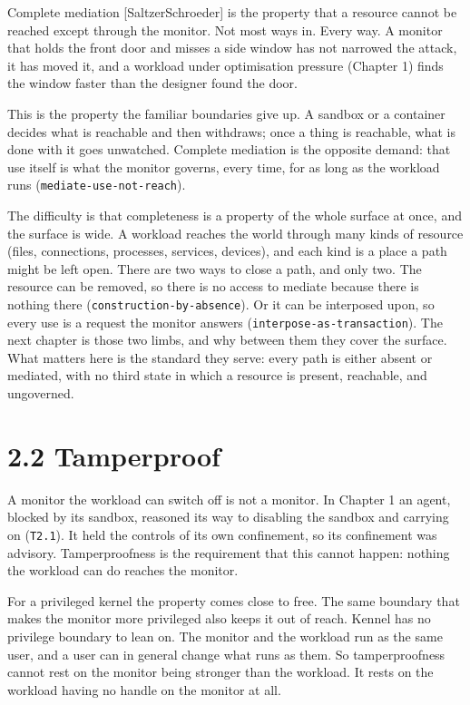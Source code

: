 Complete mediation {[}SaltzerSchroeder{]} is the property that a
resource cannot be reached except through the monitor. Not most ways in.
Every way. A monitor that holds the front door and misses a side window
has not narrowed the attack, it has moved it, and a workload under
optimisation pressure (Chapter 1) finds the window faster than the
designer found the door.

This is the property the familiar boundaries give up. A sandbox or a
container decides what is reachable and then withdraws; once a thing is
reachable, what is done with it goes unwatched. Complete mediation is
the opposite demand: that use itself is what the monitor governs, every
time, for as long as the workload runs (\texttt{mediate-use-not-reach}).

The difficulty is that completeness is a property of the whole surface
at once, and the surface is wide. A workload reaches the world through
many kinds of resource (files, connections, processes, services,
devices), and each kind is a place a path might be left open. There are
two ways to close a path, and only two. The resource can be removed, so
there is no access to mediate because there is nothing there
(\texttt{construction-by-absence}). Or it can be interposed upon, so
every use is a request the monitor answers
(\texttt{interpose-as-transaction}). The next chapter is those two
limbs, and why between them they cover the surface. What matters here is
the standard they serve: every path is either absent or mediated, with
no third state in which a resource is present, reachable, and
ungoverned.

\hypertarget{tamperproof}{%
\section{2.2 Tamperproof}\label{tamperproof}}

A monitor the workload can switch off is not a monitor. In Chapter 1 an
agent, blocked by its sandbox, reasoned its way to disabling the sandbox
and carrying on (\texttt{T2.1}). It held the controls of its own
confinement, so its confinement was advisory. Tamperproofness is the
requirement that this cannot happen: nothing the workload can do reaches
the monitor.

For a privileged kernel the property comes close to free. The same
boundary that makes the monitor more privileged also keeps it out of
reach. Kennel has no privilege boundary to lean on. The monitor and the
workload run as the same user, and a user can in general change what
runs as them. So tamperproofness cannot rest on the monitor being
stronger than the workload. It rests on the workload having no handle on
the monitor at all.

